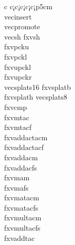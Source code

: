 \begin{table}
{\begin{tabular}{c c¡c¡c¡c¡c¡p{5cm}}
                 \\ vecinsert \\ vecpromote \\ vecsh fxvsh \\ fxvpcku \\ fxvpckl \\ fxvupckl \\fxvupckr \\ vecsplats16 fxvsplatb \\ fxvsplath vecsplats8 \\ fxvcmp \\ fxvmtac \\fxvmtacf \\fxvaddactacm \\fxvaddactacf\\fxvaddacm\\fxvaddacfs\\fxvmam\\fxvmafs\\fxvmatacm\\fxvmatacfs\\fxvmultacm\\fxvmultacfs\\fxvaddtac


        \end{tabular}
    }
\end{table}


